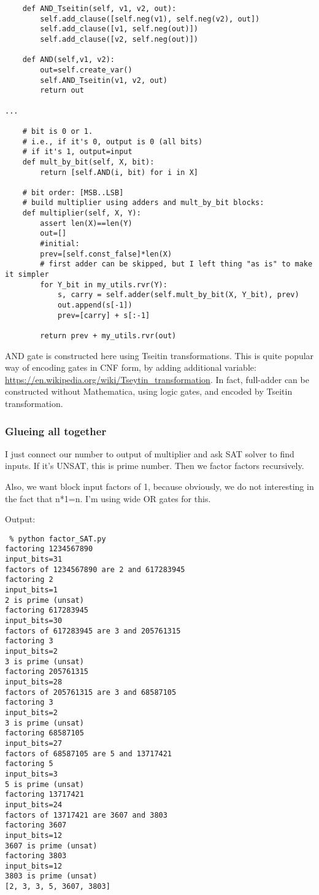 \begin{lstlisting}
    def AND_Tseitin(self, v1, v2, out):
        self.add_clause([self.neg(v1), self.neg(v2), out])
        self.add_clause([v1, self.neg(out)])
        self.add_clause([v2, self.neg(out)])
    
    def AND(self,v1, v2):
        out=self.create_var()
        self.AND_Tseitin(v1, v2, out)
        return out

...

    # bit is 0 or 1.
    # i.e., if it's 0, output is 0 (all bits)
    # if it's 1, output=input
    def mult_by_bit(self, X, bit):
        return [self.AND(i, bit) for i in X]

    # bit order: [MSB..LSB]
    # build multiplier using adders and mult_by_bit blocks:
    def multiplier(self, X, Y):
        assert len(X)==len(Y)
        out=[]
        #initial:
        prev=[self.const_false]*len(X)
        # first adder can be skipped, but I left thing "as is" to make it simpler
        for Y_bit in my_utils.rvr(Y):
            s, carry = self.adder(self.mult_by_bit(X, Y_bit), prev)
            out.append(s[-1])
            prev=[carry] + s[:-1]
    
        return prev + my_utils.rvr(out)
\end{lstlisting}

AND gate is constructed here using Tseitin transformations.
This is quite popular way of encoding gates in CNF form, by adding additional variable:
\url{https://en.wikipedia.org/wiki/Tseytin_transformation}.
In fact, full-adder can be constructed without Mathematica, using logic gates, and encoded by Tseitin transformation.

\subsubsection{Glueing all together}


I just connect our number to output of multiplier and ask SAT solver to find inputs.
If it's UNSAT, this is prime number.
Then we factor factors recursively.

Also, we want block input factors of 1, because obviously, we do not interesting in the fact that n*1=n.
I'm using wide OR gates for this.

Output:

\begin{lstlisting}
 % python factor_SAT.py
factoring 1234567890
input_bits=31
factors of 1234567890 are 2 and 617283945
factoring 2
input_bits=1
2 is prime (unsat)
factoring 617283945
input_bits=30
factors of 617283945 are 3 and 205761315
factoring 3
input_bits=2
3 is prime (unsat)
factoring 205761315
input_bits=28
factors of 205761315 are 3 and 68587105
factoring 3
input_bits=2
3 is prime (unsat)
factoring 68587105
input_bits=27
factors of 68587105 are 5 and 13717421
factoring 5
input_bits=3
5 is prime (unsat)
factoring 13717421
input_bits=24
factors of 13717421 are 3607 and 3803
factoring 3607
input_bits=12
3607 is prime (unsat)
factoring 3803
input_bits=12
3803 is prime (unsat)
[2, 3, 3, 5, 3607, 3803]
\end{lstlisting}

